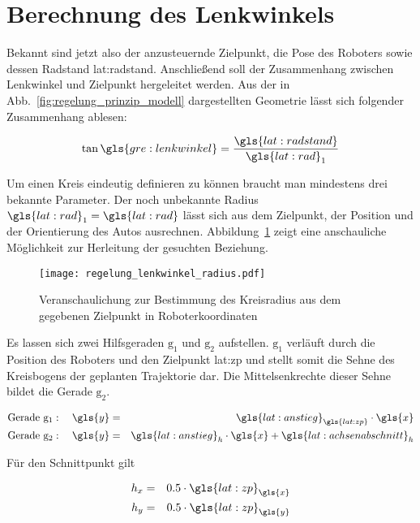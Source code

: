 \section{Berechnung des Lenkwinkels}

Bekannt sind jetzt also der anzusteuernde Zielpunkt, die Pose des Roboters sowie dessen Radstand \gls{lat:radstand}. Anschließend soll der Zusammenhang zwischen Lenkwinkel und Zielpunkt hergeleitet werden. 
Aus der in Abb.~\ref{fig:regelung_prinzip_modell} dargestellten Geometrie lässt sich folgender Zusammenhang ablesen:

\begin{equation}
\tan \gls{gre:lenkwinkel} = \frac{\gls{lat:radstand}}{{\gls{lat:rad}}_1}
\label{eq:regelung_lenkwinkel_lenkwinkeltan}
\end{equation}

Um einen Kreis eindeutig definieren zu können braucht man mindestens drei bekannte Parameter. Der noch unbekannte Radius \({\gls{lat:rad}}_1 = \gls{lat:rad}\) lässt sich aus dem Zielpunkt, der Position und der Orientierung des Autos ausrechnen. Abbildung~\ref{fig:regelung_lenkwinkel_radius} zeigt eine anschauliche Möglichkeit zur Herleitung der gesuchten Beziehung. 

\begin{figure}[H] %
  \centering
  \texttt{[image: regelung\_lenkwinkel\_radius.pdf]}
  \caption{Veranschaulichung zur Bestimmung des Kreisradius aus dem gegebenen Zielpunkt in Roboterkoordinaten}
  \label{fig:regelung_lenkwinkel_radius}
\end{figure}

Es lassen sich zwei Hilfsgeraden \( \mathrm{g_1} \) und \( \mathrm{g_2} \) aufstellen. \( \mathrm{g_1}\) verläuft durch die Position des Roboters  und den Zielpunkt \gls{lat:zp} und stellt somit die Sehne des Kreisbogens der geplanten Trajektorie dar. Die Mittelsenkrechte dieser Sehne bildet die Gerade \( \mathrm{g_2} \).

\begin{eqnarray}
\text{Gerade } \mathrm{g_1}: \quad \gls{y} & = & {\gls{lat:anstieg}}_{\gls{lat:zp}} \cdot \gls{x} 	\\
\text{Gerade } \mathrm{g_2}: \quad \gls{y} & = & {\gls{lat:anstieg}}_h \cdot \gls{x} + {\gls{lat:achsenabschnitt}}_h  \label{eq:regelung_lenkwinkel_geradengleichung2}
\end{eqnarray}

Für den Schnittpunkt  gilt

\begin{eqnarray}
h_x & = & 0.5 \cdot {\gls{lat:zp}}_{\gls{x}} 	\\
h_y & = & 0.5 \cdot {\gls{lat:zp}}_{\gls{y}}
\end{eqnarray}

